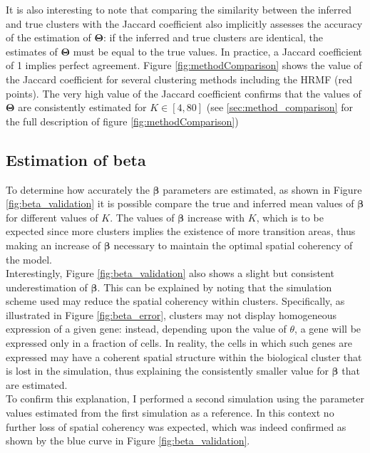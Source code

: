 	It is also interesting to note that comparing the similarity between the inferred and true clusters with the Jaccard coefficient also implicitly assesses the accuracy of the estimation of $\boldsymbol{\Theta}$: if the inferred and true clusters are identical, the estimates of $\boldsymbol{\Theta}$ must be equal to the true values. In practice, a Jaccard coefficient of 1 implies perfect agreement. Figure \ref{fig:methodComparison} shows the value of the Jaccard coefficient for several clustering methods including the HRMF (red points). The very high value of the Jaccard coefficient confirms that the values of $\boldsymbol{\Theta}$ are consistently estimated for $K \in [4,80]$ (see \ref{sec:method_comparison} for the full description of figure \ref{fig:methodComparison})\\
	

	\subsection{Estimation of beta}\label{subsec:beta_estimation}
	To determine how accurately the $\boldsymbol{\beta}$ parameters are estimated, as shown in Figure \ref{fig:beta_validation} it is possible compare the true and inferred mean values of $\boldsymbol{\beta}$ for different values of $K$. The values of $\boldsymbol{\beta}$ increase with $K$, which is to be expected since more clusters implies the existence of more transition areas, thus making an increase of $\boldsymbol{\beta}$ necessary to maintain the optimal spatial coherency of the model.\\
	
	Interestingly, Figure \ref{fig:beta_validation} also shows a slight but consistent underestimation of $\boldsymbol{\beta}$. This can be explained by noting that the simulation scheme used may reduce the spatial coherency within clusters. Specifically, as illustrated in Figure \ref{fig:beta_error}, clusters may not display homogeneous expression of a given gene: instead, depending upon the value of $\theta$, a gene will be expressed only in a fraction of cells. In reality, the cells in which such genes are expressed may have a coherent spatial structure within the biological cluster that is lost in the simulation, thus explaining the consistently smaller value for $\boldsymbol{\beta}$ that are estimated.\\
	
	 To confirm this explanation, I performed a second simulation using the parameter values estimated from the first simulation as a reference. In this context no further loss of spatial coherency was expected, which was indeed confirmed as shown by the blue curve in Figure \ref{fig:beta_validation}.\\
	
